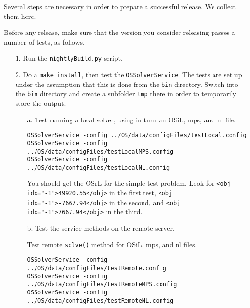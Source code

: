\label{section:ReleaseProcedure}

Several steps are necessary in order to prepare a successful release. We collect them here.


\label{section:ReleaseTesting}

Before any release, make sure that the version you consider releasing passes a number of tests, as follows. 

\begin{itemize}

\item[1.] Run the {\tt nightlyBuild.py} script.

\item[2.] Do a {\tt make install}, then test the {\tt OSSolverService}. The tests are set up under the
assumption that this is done from the {\tt bin} directory. Switch into  the {\tt bin} directory and create a subfolder {\tt tmp} there in order to temporarily store the output.

\begin{itemize}
\item[a.] Test running a local solver,  
using in turn an OSiL, mps, and nl file.

\begin{verbatim}
OSSolverService -config ../OS/data/configFiles/testLocal.config
OSSolverService -config ../OS/data/configFiles/testLocalMPS.config
OSSolverService -config ../OS/data/configFiles/testLocalNL.config
\end{verbatim}

You should get the OSrL for the simple test problem.  
Look for {\tt <obj idx="-1">49920.55</obj>} in the first test, 
{\tt <obj idx="-1">-7667.94</obj>} in the second, 
and {\tt <obj idx="-1">7667.94</obj>} in the third.

\item[b.]  Test the service methods on the remote server.  

 Test remote {\tt solve()} method for OSiL, mps, and nl files.

\begin{verbatim}
OSSolverService -config ../OS/data/configFiles/testRemote.config
OSSolverService -config ../OS/data/configFiles/testRemoteMPS.config
OSSolverService -config ../OS/data/configFiles/testRemoteNL.config
\end{verbatim}



\end{itemize}
\end{itemize}
